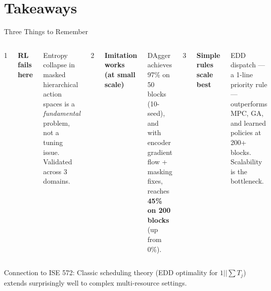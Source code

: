 \documentclass[aspectratio=169,12pt]{beamer}
\begin{document}
\section{Takeaways}

\begin{frame}{Three Things to Remember}

\vspace{1em}

\begin{columns}[T]
\centering
{\Huge\color{danger} 1}

\vspace{0.5em}
\textbf{RL fails here}

\vspace{0.3em}
{\small Entropy collapse in masked hierarchical action spaces is a \textit{fundamental} problem, not a tuning issue. Validated across 3 domains.}

\centering
{\Huge\color{success} 2}

\vspace{0.5em}
\textbf{Imitation works\\(at small scale)}

\vspace{0.3em}
{\small DAgger achieves 97\% on 50 blocks (10-seed), and with encoder gradient flow + masking fixes, reaches \textbf{45\% on 200 blocks} (up from 0\%).}

\centering
{\Huge\color{accent} 3}

\vspace{0.5em}
\textbf{Simple rules\\scale best}

\vspace{0.3em}
{\small EDD dispatch --- a 1-line priority rule --- outperforms MPC, GA, and learned policies at 200+ blocks. Scalability is the bottleneck.}
\end{columns}

\vspace{1.5em}
\centering
{\color{muted}\small Connection to ISE 572: Classic scheduling theory (EDD optimality for $1||\sum T_j$) extends surprisingly well to complex multi-resource settings.}
\end{frame}
\end{document}
